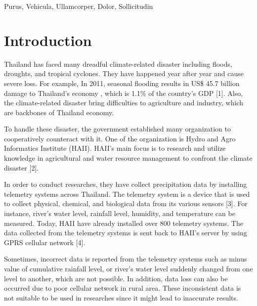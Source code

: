 \documentclass[conference]{IEEEtran}
\begin{document}
\begin{IEEEkeywords}
Purus, Vehicula, Ullamcorper, Dolor, Sollicitudin
\end{IEEEkeywords}

\IEEEpeerreviewmaketitle

\section{Introduction}

Thailand has faced many dreadful climate-related disaster including floods, droughts, and tropical cyclones. They have happened year after year and cause severe loss. For example, In 2011, seasonal flooding results in US\$ 45.7 billion damage to Thailand’s economy , which is 1.1\% of the country’s GDP [1]. Also, the climate-related disaster bring difficulties to agriculture and industry, which are backbones of Thailand economy.

To handle these disaster, the government established many organization to cooperatively counteract with it. One of the organization is Hydro and Agro Informatics Institute (HAII). HAII’s main focus is to research and utilize knowledge in agricultural and water resource management to confront the climate disaster [2].

In order to conduct researches, they have collect precipitation data by installing telemetry systems across Thailand. The telemetry system is a device that is used to collect physical, chemical, and biological data from its various sensors [3]. For instance, river’s water level, rainfall level, humidity, and temperature can be measured. Today, HAII have already installed over 800 telemetry systems. The data collected from the telemetry systems is sent back to HAII’s server by using GPRS cellular network [4].

Sometimes, incorrect data is reported from the telemetry systems such as minus value of cumulative rainfall level, or river’s water level suddenly changed from one level to another, which are not possible. In addition, data loss can also be occurred due to poor cellular network in rural area. These inconsistent data is not suitable to be used in researches since it might lead to inaccurate results.
\end{document}
